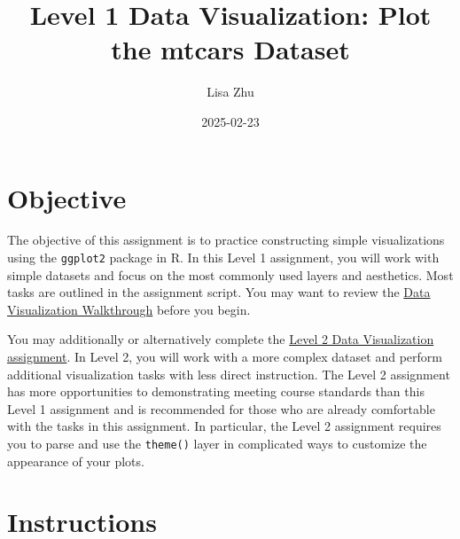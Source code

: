 \documentclass[
  man,
  floatsintext,
  longtable,
  nolmodern,
  notxfonts,
  notimes,
  colorlinks=true,linkcolor=blue,citecolor=blue,urlcolor=blue]{apa7}
\title{Level 1 Data Visualization: Plot the mtcars Dataset}
\author{Lisa Zhu}
\affiliation{
{MA Program in the Social Sciences, University of Chicago}}
\date{2025-02-23}
\begin{document}
\maketitle


\setcounter{secnumdepth}{-\maxdimen} %

\setlength\LTleft{0pt}


\section{Objective}\label{objective}

The objective of this assignment is to practice constructing simple
visualizations using the \texttt{ggplot2} package in R. In this Level 1
assignment, you will work with simple datasets and focus on the most
commonly used layers and aesthetics. Most tasks are outlined in the
assignment script. You may want to review the
\href{../00_viz-walkthrough}{Data Visualization Walkthrough} before you
begin.

You may additionally or alternatively complete the
\href{../02_viz-level-2}{Level 2 Data Visualization assignment}. In
Level 2, you will work with a more complex dataset and perform
additional visualization tasks with less direct instruction. The Level 2
assignment has more opportunities to demonstrating meeting course
standards than this Level 1 assignment and is recommended for those who
are already comfortable with the tasks in this assignment. In
particular, the Level 2 assignment requires you to parse and use the
\texttt{theme()} layer in complicated ways to customize the appearance
of your plots.

\section{Instructions}\label{instructions}
\end{document}
